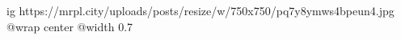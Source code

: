  
 
 
 
 

\ifcmt
  ig https://mrpl.city/uploads/posts/resize/w/750x750/pq7y8ymws4bpeun4.jpg
  @wrap center
  @width 0.7
\fi

